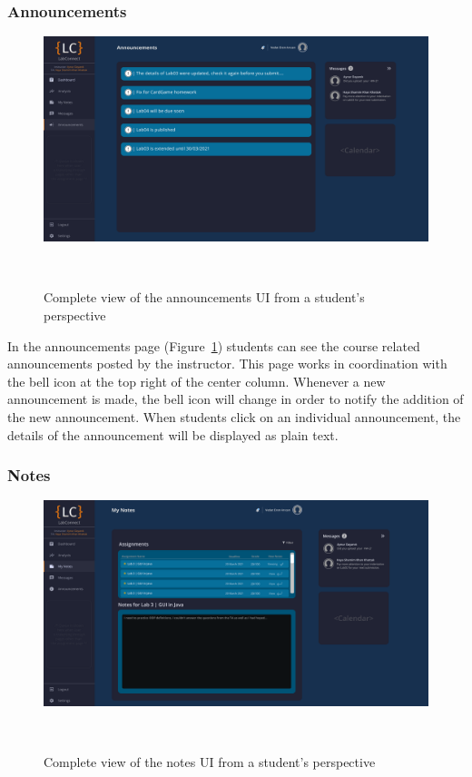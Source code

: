 \documentclass[a4paper, 12pt]{article}
\begin{document}
    \pagebreak

    \subsubsection{Announcements}

    \begin{figure}[H]
        \centering
        \includegraphics[width=\textwidth]{student_announcements}
        \caption{Complete view of the announcements UI from a student's perspective}~\label{fig:student_announcements_full}
    \end{figure}

    In the announcements page (Figure~\ref{fig:student_announcements_full}) students can see the course related announcements posted by the instructor.
    This page works in coordination with the bell icon at the top right of the center column.
    Whenever a new announcement is made, the bell icon will change in order to notify the addition of the
    new announcement. When students click on an individual announcement, the details of the announcement will be displayed as plain text.


    \pagebreak

    \subsubsection{Notes}

    \begin{figure}[H]
        \centering
        \includegraphics[width=\textwidth]{student_notes}
        \caption{Complete view of the notes UI from a student's perspective}~\label{fig:student_notes_full}
    \end{figure}
\end{document}
